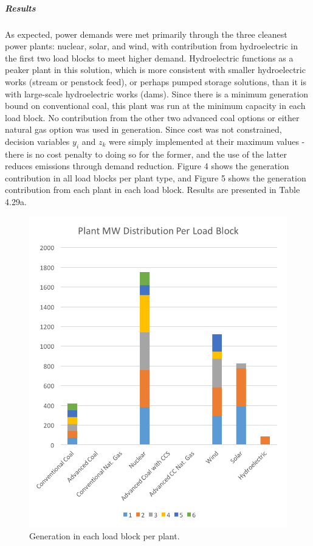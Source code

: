 \documentclass{article}
\begin{document}
	\subparagraph{Results}
		As expected, power demands were met primarily through the three cleanest power plants: nuclear, solar, and wind, with contribution from hydroelectric in the first two load blocks to meet higher demand. Hydroelectric functions as a peaker plant in this solution, which is more consistent with smaller hydroelectric works (stream or penstock feed), or perhaps pumped storage solutions, than it is with large-scale hydroelectric works (dams). Since there is a minimum generation bound on conventional coal, this plant was run at the minimum capacity in each load block. No contribution from the other two advanced coal options or either natural gas option was used in generation. Since cost was not constrained, decision variables $y_i$ and $z_k$ were simply implemented at their maximum values - there is no cost penalty to doing so for the former, and the use of the latter reduces emissions through demand reduction. Figure 4 shows the generation contribution in all load blocks per plant type, and Figure 5 shows the generation contribution from each plant in each load block. Results are presented in Table 4.29a.
		
		\begin{figure}
			\includegraphics[scale=0.9]{429_4_Minemplantdist}
			\centering
			\caption{Generation in each load block per plant.}
		\end{figure}
		
\end{document}
